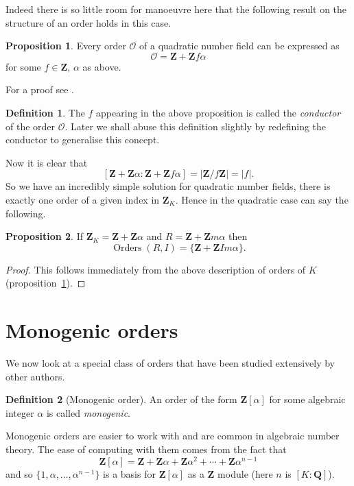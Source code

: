 \documentclass[a4paper,abstracton,bibtotoc]{scrreprt}
\theoremstyle{definition}
\newtheorem{prop}{Proposition}
\newtheorem{defn}{Definition}
\newcommand{\QQ}{\mathbf{Q}}
\newcommand{\ZZ}{\mathbf{Z}}
\renewcommand{\O}{\mathcal{O}}
\DeclareMathOperator{\Orders}{Orders}
\begin{document}
Indeed there is so little room for manoeuvre here that the following result on the structure of an order holds in this case.

\begin{prop}
\label{prop:quadord}
Every order $\O$ of a quadratic number field can be expressed as
\[\O = \ZZ + \ZZ f\alpha\]
for some $f\in \ZZ$, $\alpha$ as above.
\end{prop}

For a proof see \cite[pp. 133--134]{cox}.

\begin{defn}
The $f$ appearing in the above proposition is called the \emph{conductor} of the order $\O$.
Later we shall abuse this definition slightly by redefining the conductor to generalise this concept.
\end{defn}

Now it is clear that
\[
[\ZZ + \ZZ\alpha : \ZZ + \ZZ f \alpha] = |\ZZ/f\ZZ| = |f|.
\]
So we have an incredibly simple solution for quadratic number fields, there is exactly one order of a given index in $\ZZ_K$.
Hence in the quadratic case can say the following.

\begin{prop}
If $\ZZ_K = \ZZ + \ZZ\alpha$ and $R = \ZZ + \ZZ m\alpha$ then
\[
\Orders(R, I) = \{\ZZ + \ZZ Im\alpha\}.
\]
\end{prop}
\begin{proof}
This follows immediately from the above description of orders of $K$ (proposition~\ref{prop:quadord}).
\end{proof}


\section{Monogenic orders}

We now look at a special class of orders that have been studied extensively by other authors.

\begin{defn}[Monogenic order]
An order of the form $\ZZ[\alpha]$ for some algebraic integer $\alpha$ is called \emph{monogenic}.
\end{defn}

Monogenic orders are easier to work with and are common in algebraic number theory.
The ease of computing with them comes from the fact that
\[
\ZZ[\alpha] = \ZZ + \ZZ\alpha + \ZZ\alpha^2 + \cdots + \ZZ\alpha^{n-1}
\]
and so $\{1,\alpha,\ldots,\alpha^{n-1}\}$ is a basis for $\ZZ[\alpha]$ as a $\ZZ$ module (here $n$ is $[K : \QQ]$).
\end{document}
